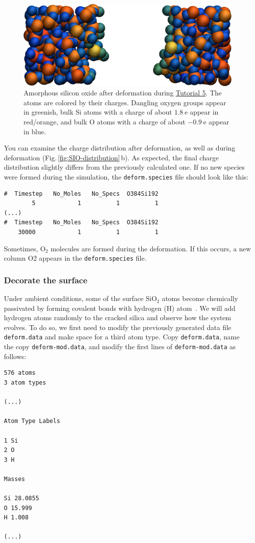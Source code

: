 \documentclass[9pt,tutorial]{livecoms}
\newcommand{\lmpcmd}[1]{\hspace{0pt}\colorbox{listing}{\textcolor{command}{\small{#1}}}\hspace{0pt}} %
\newcommand{\flecmd}[1]{\textcolor{command}{\texttt{#1}}} %
\begin{document}
\begin{figure}
\includegraphics[width=\linewidth]{SIO-deformed}
\caption{Amorphous silicon oxide after deformation during
\hyperref[reactive-silicon-dioxide-label]{Tutorial 5}.  The atoms are colored by their
charges.  Dangling oxygen groups appear in greenish, bulk Si atoms with a charge of
about $1.8~\text{e}$  appear in red/orange, and bulk O atoms with a charge of
about $-0.9 ~ \text{e}$ appear in blue.}
\label{fig:SIO-deformed}
\end{figure}

You can examine the charge distribution after deformation, as well as during
deformation (Fig.\,\ref{fig:SIO-distribution}\,b).  As expected, the final
charge distribution slightly differs from the previously calculated one.  If
no new species were formed during the simulation, the \flecmd{deform.species} file
should look like this:
\begin{lstlisting}
#  Timestep   No_Moles   No_Specs  O384Si192
        5            1          1          1
(...)
#  Timestep   No_Moles   No_Specs  O384Si192
    30000            1          1          1
\end{lstlisting}
Sometimes, $\text{O}_2$ molecules are formed during the deformation.  If this occurs,
a new column \lmpcmd{O2} appears in the \flecmd{deform.species} file.

\subsubsection{Decorate the surface}

Under ambient conditions, some of the surface $\text{SiO}_2$ atoms become chemically
passivated by forming covalent bonds with hydrogen (H) atom~\cite{sulpizi2012silica}.
We will add hydrogen atoms randomly to the cracked silica and observe how the
system evolves.  To do so, we first need to modify the previously generated data
file \flecmd{deform.data} and make space for a third atom type.
Copy \flecmd{deform.data}, name the copy \flecmd{deform-mod.data}, and modify the
first lines of \flecmd{deform-mod.data} as follows:
\begin{lstlisting}
576 atoms
3 atom types

(...)

Atom Type Labels

1 Si
2 O
3 H

Masses

Si 28.0855
O 15.999
H 1.008

(...)
\end{lstlisting}
\end{document}
